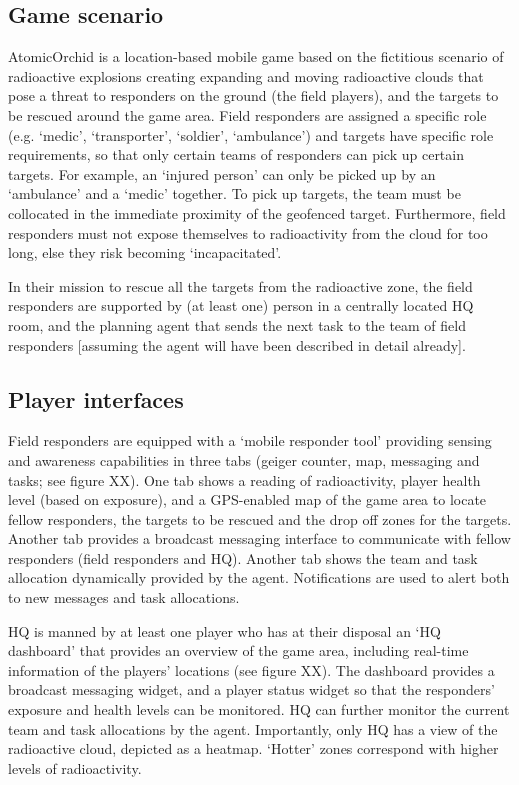 \documentclass{aamas2014}
\begin{document}
\subsection{Game scenario}
AtomicOrchid is a location-based mobile game based on the fictitious scenario of radioactive explosions creating expanding and moving radioactive clouds that pose a threat to responders on the ground (the field players), and the targets to be rescued around the game area. Field responders are assigned a specific role (e.g. `medic', `transporter', `soldier', `ambulance') and targets have specific role requirements, so that only certain teams of responders can pick up certain targets. For example, an `injured person' can only be picked up by an `ambulance' and a `medic' together. To pick up targets, the team must be collocated in the immediate proximity of the geofenced target. Furthermore, field responders must not expose themselves to radioactivity from the cloud for too long, else they risk becoming `incapacitated'.

In their mission to rescue all the targets from the radioactive zone, the field responders are supported by (at least one) person in a centrally located HQ room, and the planning agent that sends the next task to the team of field responders [assuming the agent will have been described in detail already].

\subsection{Player interfaces}
Field responders are equipped with a `mobile responder tool' providing sensing and awareness capabilities in three tabs (geiger counter, map, messaging and tasks; see figure XX). One tab shows a reading of radioactivity, player health level (based on exposure), and a GPS-enabled map of the game area to locate fellow responders, the targets to be rescued and the drop off zones for the targets. Another tab provides a broadcast messaging interface to communicate with fellow responders (field responders and HQ). Another tab shows the team and task allocation dynamically provided by the agent. Notifications are used to alert both to new messages and task allocations.

HQ is manned by at least one player who has at their disposal an `HQ dashboard' that provides an overview of the game area, including real-time information of the players' locations (see figure XX). The dashboard provides a broadcast messaging widget, and a player status widget so that the responders' exposure and health levels can be monitored. HQ can further monitor the   current team and task allocations by the agent. Importantly, only HQ has a view of the radioactive cloud, depicted as a heatmap. `Hotter' zones correspond with higher levels of radioactivity.
\end{document}
